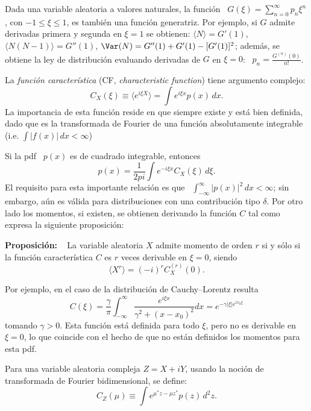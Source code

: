 {Dada   una   variable   aleatoria   a   valores  naturales,   la   funci\'on   \
$G(\xi)=\sum_{n=0}^{\infty} p_n \xi^n$, con $-1\leq \xi\leq 1$, %
es  tambi\'en una  funci\'on generatriz.  Por ejemplo,  si $G$  admite derivadas
primera  y segunda en  $\xi=1$ se  obtienen: $\langle  N\rangle=G'(1)$, $\langle
N(N-1)\rangle=G''(1)$, $\Var(N)=G''(1)+G'(1)-[G'(1)]^2$; adem\'as, se obtiene la
ley   de   distribuci\'on   evaluando   derivadas   de   $G$   en   $\xi=0$:   \
$p_n=\frac{G^{(n)}(0)}{n!}$.  %
\cite{Fra09}%

\hfill

La \emph{funci\'on caracter\'istica}  (CF, \emph{characteristic function}) tiene
argumento complejo: \cite{Luk61}
$$
C_X(\xi) \equiv \langle e^{i \xi X} \rangle = \int e^{i \xi x} p(x) \, dx .
$$
La importancia  de esta  funci\'on reside  en que siempre  existe y  est\'a bien
definida, dado que es la  transformada de Fourier de una funci\'on absolutamente
integrable (i.e. $\int |f(x)| \, dx < \infty$) \cite{Gol61}

Si la pdf \ $p(x)$ es de cuadrado integrable, entonces 
$$
p(x) = \frac{1}{2	pi} \int e^{-i \xi x} C_X(\xi) \, d\xi .
$$
El requisito  para esta importante relaci\'on es  que \ $\int_{-\infty}^{\infty}
|p(x)|^2 \, dx<\infty$;  sin embargo, a\'un es v\'alida  para distribuciones con
una contribuci\'on  tipo $\delta$.  Por otro  lado los momentos,  si existen, se
obtienen derivando la funci\'on $C$ tal como expresa la siguiente proposici\'on:

\textbf{Proposici\'on:} \ %
La  variable aleatoria  $X$  admite  momento de  orden  $r$ si  y  s\'olo si  la
funci\'on caracter\'istica $C$ es $r$ veces derivable en $\xi=0$, siendo
$$
\langle X^r\rangle = (-i)^r C_X^{(r)}(0) . 
$$

Por ejemplo, en el caso de la distribuci\'on de Cauchy--Lorentz resulta
$$
C(\xi)     =     \frac{\gamma}{\pi}    \int_{-\infty}^{\infty}     \frac{e^{i\xi
    x}}{\gamma^2+(x-x_0)^2} dx = e^{-\gamma |\xi| e^{i x_0\xi}}
$$
tomando $\gamma >0$. Esta funci\'on est\'a  definida para todo $\xi$, pero no es
derivable en $\xi=0$,  lo que coincide con el hecho de  que no est\'an definidos
los momentos para esta pdf.

Para  una   variable  aleatoria  compleja   $Z=X+iY$,  usando  la   noci\'on  de
transformada de Fourier bidimensional, se define:
$$
C_Z(\mu) \equiv \int e^{\mu^* z-\mu z^*} p(z) \, d^2z .
$$

}
